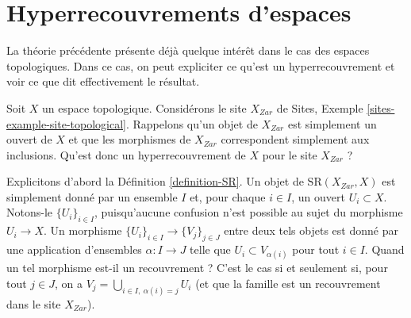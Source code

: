 \section{Hyperrecouvrements d'espaces}
\label{section-hypercoverings-spaces}

\noindent
La théorie précédente présente déjà quelque intérêt dans le cas des espaces
topologiques. Dans ce cas, on peut expliciter ce qu'est un hyperrecouvrement et voir
ce que dit effectivement le résultat.

\medskip\noindent
Soit $X$ un espace topologique. Considérons le site $X_{Zar}$
de Sites, Exemple \ref{sites-example-site-topological}. Rappelons qu'un
objet de $X_{Zar}$ est simplement un ouvert de $X$ et que les morphismes
de $X_{Zar}$ correspondent simplement aux inclusions. Qu'est donc un
hyperrecouvrement de $X$ pour le site $X_{Zar}$ ?

\medskip\noindent
Explicitons d'abord la Définition \ref{definition-SR}.
Un objet de $\text{SR}(X_{Zar}, X)$ est simplement donné par un ensemble
$I$ et, pour chaque $i \in I$, un ouvert $U_i \subset X$.
Notons-le $\{U_i\}_{i \in I}$, puisqu'aucune
confusion n'est possible au sujet du morphisme $U_i \to X$.
Un morphisme $\{U_i\}_{i \in I} \to \{V_j\}_{j \in J}$
entre deux tels objets est donné par une application d'ensembles
$\alpha : I \to J$ telle que $U_i \subset V_{\alpha(i)}$ pour tout
$i \in I$. Quand un tel morphisme est-il un recouvrement ? C'est le cas
si et seulement si, pour tout $j \in J$, on a
$V_j = \bigcup_{i\in I, \ \alpha(i) = j} U_i$ (et que la famille est
un recouvrement dans le site $X_{Zar}$).

